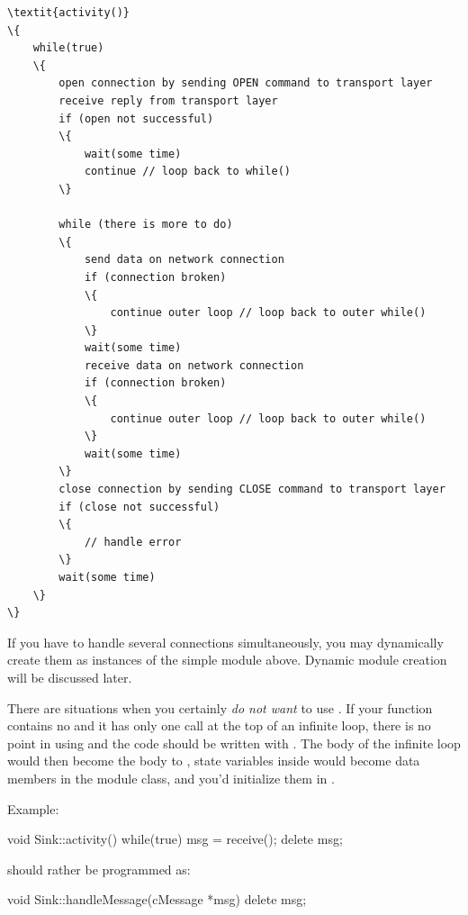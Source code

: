 \begin{Verbatim}[commandchars=\\\{\}]
\textit{activity()}
\{
    while(true)
    \{
        open connection by sending OPEN command to transport layer
        receive reply from transport layer
        if (open not successful)
        \{
            wait(some time)
            continue // loop back to while()
        \}

        while (there is more to do)
        \{
            send data on network connection
            if (connection broken)
            \{
                continue outer loop // loop back to outer while()
            \}
            wait(some time)
            receive data on network connection
            if (connection broken)
            \{
                continue outer loop // loop back to outer while()
            \}
            wait(some time)
        \}
        close connection by sending CLOSE command to transport layer
        if (close not successful)
        \{
            // handle error
        \}
        wait(some time)
    \}
\}
\end{Verbatim}

If you have to handle several connections simultaneously, you may
dynamically create them as instances of the simple module above.
Dynamic module creation will be discussed later.

There are situations when you certainly \textit{do not want} to use .
If your  function contains no  and it has
only one  call at the top of an infinite loop,
there is no point in using  and the code should be written
with .
The body of the infinite loop would then become the body to ,
state variables inside  would become data members in
the module class, and you'd initialize them in .

Example:

\begin{cpp}
void Sink::activity()
{
    while(true)
    {
        msg = receive();
        delete msg;
    }
}
\end{cpp}

should rather be programmed as:

\begin{cpp}
void Sink::handleMessage(cMessage *msg)
{
    delete msg;
}
\end{cpp}



